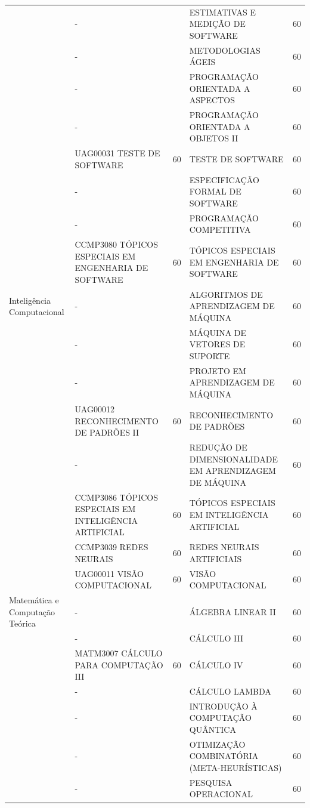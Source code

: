 \documentclass[
	12pt,				%
	openright,			%
  oneside,     %
	a4paper,			%
	chapter=TITLE,		%
	english,			%
	french,				%
	spanish,			%
	brazil				%
	]{abntex2}
\begin{document}
\begin{center}
\begin{tiny}
\begin{longtable}{p{2cm}p{5.4cm}cp{5.4cm}c}
      & - & & ESTIMATIVAS E MEDIÇÃO DE SOFTWARE & 60 \\ \cline{2-5}
      & - & & METODOLOGIAS ÁGEIS & 60 \\ \cline{2-5}
      & - & & PROGRAMAÇÃO ORIENTADA A ASPECTOS & 60 \\ \cline{2-5}
      & - & & PROGRAMAÇÃO ORIENTADA A OBJETOS II & 60 \\ \cline{2-5}
      & UAG00031 TESTE DE SOFTWARE & 60 & TESTE DE SOFTWARE & 60 \\ \cline{2-5}
      & - & & ESPECIFICAÇÃO FORMAL DE SOFTWARE & 60 \\ \cline{2-5}
      & - & & PROGRAMAÇÃO COMPETITIVA & 60 \\ \cline{2-5}
      & CCMP3080 TÓPICOS ESPECIAIS EM ENGENHARIA DE SOFTWARE & 60 & TÓPICOS ESPECIAIS EM ENGENHARIA DE SOFTWARE & 60 \\ \midrule
    Inteligência Computacional & - & & ALGORITMOS DE APRENDIZAGEM DE MÁQUINA & 60 \\ \cline{2-5}
      & - & & MÁQUINA DE VETORES DE SUPORTE & 60 \\ \cline{2-5}
      & - & & PROJETO EM APRENDIZAGEM DE MÁQUINA & 60 \\ \cline{2-5}
      & UAG00012 RECONHECIMENTO DE PADRÕES II & 60 & RECONHECIMENTO DE PADRÕES & 60 \\ \cline{2-5}
      & - & & REDUÇÃO DE DIMENSIONALIDADE EM APRENDIZAGEM DE MÁQUINA & 60 \\ \cline{2-5}
      & CCMP3086 TÓPICOS ESPECIAIS EM INTELIGÊNCIA ARTIFICIAL & 60 & TÓPICOS ESPECIAIS EM INTELIGÊNCIA ARTIFICIAL & 60 \\ \cline{2-5}
      & CCMP3039 REDES NEURAIS & 60 & REDES NEURAIS ARTIFICIAIS & 60 \\ \cline{2-5}
      & UAG00011 VISÃO COMPUTACIONAL & 60 & VISÃO COMPUTACIONAL & 60 \\ \midrule
    Matemática e Computação Teórica & - & & ÁLGEBRA LINEAR II & 60 \\ \cline{2-5}
      & - & & CÁLCULO III & 60 \\ \cline{2-5}
      & MATM3007 CÁLCULO PARA COMPUTAÇÃO III & 60 & CÁLCULO IV & 60 \\ \cline{2-5}
      & - & & CÁLCULO LAMBDA & 60 \\ \cline{2-5}
      & - & & INTRODUÇÃO À COMPUTAÇÃO QUÂNTICA  & 60 \\ \cline{2-5}
      & - & & OTIMIZAÇÃO COMBINATÓRIA (META-HEURÍSTICAS) & 60 \\ \cline{2-5}
      & - & & PESQUISA OPERACIONAL & 60 \\ \cline{2-5}

\end{longtable}
\end{tiny}
\end{center}
\end{document}
